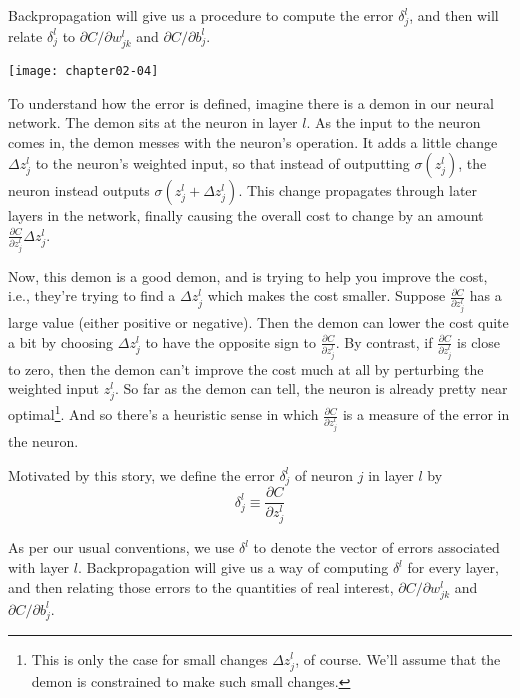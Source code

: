 Backpropagation will give us a procedure to compute the error $\delta^{l}_j$, and then will relate $\delta_{j}^{l}$ to $\partial C / \partial w_{j k}^{l}$ and $\partial C / \partial b_{j}^{l}$.

\begin{marginfigure}
\texttt{[image: chapter02-04]}
\end{marginfigure}

To understand how the error is defined, imagine there is a demon in our neural network.
The demon sits at the  neuron in layer $l$. As the input to the neuron comes in, the demon messes with the neuron's operation. It adds a little change $\Delta z_{j}^{l}$ to the neuron's weighted input, so that instead of outputting $\sigma\left(z_{j}^{l}\right)$, the neuron instead outputs $\sigma\left(z_{j}^{l}+\Delta z_{j}^{l}\right)$. This change propagates through later layers in the network, finally causing the overall cost to change by an amount $\frac{\partial C}{\partial z_{j}^{l}} \Delta z_{j}^{l}$.

Now, this demon is a good demon, and is trying to help you improve the cost, i.e., they're trying to find a $\Delta z_{j}^{l}$
which makes the cost smaller. Suppose $\frac{\partial C}{\partial z_{j}^{l}}$ has a large value (either positive or negative). Then the demon can lower the cost quite a bit by choosing $\Delta z_{j}^{l}$ to have the opposite sign to $\frac{\partial C}{\partial z_{j}^{l}}$. By contrast, if $\frac{\partial C}{\partial z_{j}^{l}}$ is close to zero, then the demon can't improve the cost much at all by perturbing the weighted input $ z_{j}^{l}$. So far as the demon can tell, the neuron is already pretty near optimal\footnote{This is only the case for small changes $\Delta z_{j}^{l}$, of course. We'll assume that the demon is constrained to make such small changes.}. And so there's a heuristic sense in which $\frac{\partial C}{\partial z_{j}^{l}}$
is a measure of the error in the neuron.

Motivated by this story, we define the error $\delta_{j}^{l}$ of neuron $j$ in layer $l$ by 
\begin{equation}
\delta_{j}^{l} \equiv \frac{\partial C}{\partial z_{j}^{l}}
\label{eq:c02-29}
\end{equation}

As per our usual conventions, we use $\delta^{l}$ to denote the vector of errors associated with layer $l$. Backpropagation will give us a way of computing  $\delta^{l}$  for every layer, and then relating those errors to the quantities of real interest, $\partial C / \partial w_{j k}^{l}$ and $\partial C / \partial b_{j}^{l}$.

